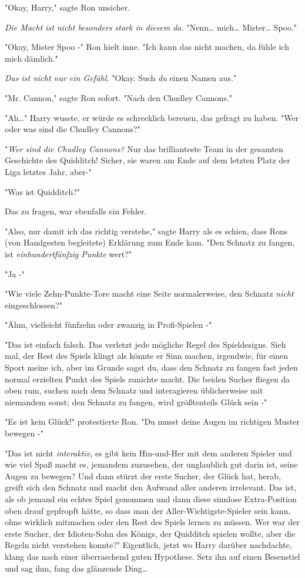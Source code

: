 {"Okay, Harry," sagte Ron unsicher.

\emph{Die Macht ist nicht besonders stark in diesem da.} "Nenn… mich… Mister… Spoo."

"Okay, Mister Spoo -" Ron hielt inne. "Ich kann das nicht machen, da fühle ich mich dämlich."

\emph{Das ist nicht nur ein Gefühl.} "Okay. Such \emph{du} einen Namen aus."

"Mr. Cannon," sagte Ron sofort. "Nach den Chudley Cannons."

"Ah…" Harry wusste, er würde es schrecklich bereuen, das gefragt zu haben. "Wer oder was sind die Chudley Cannons?"

"\emph{Wer sind die Chudley Cannons?} Nur das brillianteste Team in der gesamten Geschichte des Quidditch! Sicher, sie waren am Ende auf dem letzten Platz der Liga letztes Jahr, aber-"

"Was ist Quidditch?"

Das zu fragen, war ebenfalls ein Fehler.

"Also, nur damit ich das richtig verstehe," sagte Harry als es schien, dass Rons (von Handgesten begleitete) Erklärung zum Ende kam. "Den Schnatz zu fangen, ist \emph{einhundertfünfzig Punkte} wert?"

"Ja -"

"Wie viele Zehn-Punkte-Tore macht eine Seite normalerweise, den Schnatz \emph{nicht} eingeschlossen?"

"Ähm, vielleicht fünfzehn oder zwanzig in Profi-Spielen -"

"Das ist einfach falsch. Das verletzt jede mögliche Regel des Spieldesigns. Sieh mal, der Rest des Spiels klingt als könnte er Sinn machen, irgendwie, für einen Sport meine ich, aber im Grunde sagst du, dass den Schnatz zu fangen fast jeden normal erzielten Punkt des Spiels zunichte macht. Die beiden Sucher fliegen da oben rum, suchen nach dem Schnatz und interagieren üblicherweise mit niemandem sonst; den Schnatz zu fangen, wird größtenteils Glück sein -"

"Es ist kein Glück!" protestierte Ron. "Du musst deine Augen im richtigen Muster bewegen -"

"Das ist nicht \emph{interaktiv,} es gibt kein Hin-und-Her mit dem anderen Spieler und wie viel Spaß macht es, jemandem zuzusehen, der unglaublich gut darin ist, seine Augen zu bewegen? Und dann stürzt der erste Sucher, der Glück hat, herab, greift sich den Schnatz und macht den Aufwand aller anderen irrelevant. Das ist, als ob jemand ein echtes Spiel genommen und dann diese sinnlose Extra-Position oben drauf gepfropft hätte, so dass man der Aller-Wichtigste-Spieler sein kann, ohne wirklich mitmachen oder den Rest des Spiels lernen zu müssen. Wer war der erste Sucher, der Idioten-Sohn des Königs, der Quidditch spielen wollte, aber die Regeln nicht verstehen konnte?" Eigentlich, jetzt wo Harry darüber nachdachte, klang das nach einer überraschend guten Hypothese. Setz ihn auf einen Besenstiel und sag ihm, fang das glänzende Ding…

}
